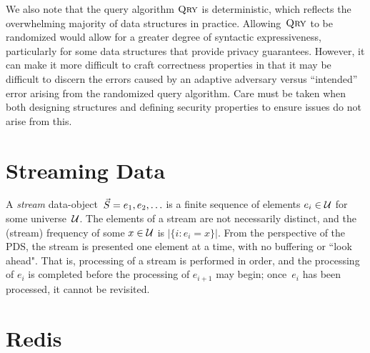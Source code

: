 We also note that the query algorithm $\textnormal{\textsc{Qry}}$ is deterministic, which reflects the overwhelming majority of data structures in practice. Allowing~$\textnormal{\textsc{Qry}}$ to be randomized would allow for a greater degree of syntactic expressiveness, particularly for some data structures that provide privacy guarantees. However, it can make it more difficult to craft correctness properties in that it may be difficult to discern the errors caused by an adaptive adversary versus ``intended'' error arising from the randomized query algorithm. Care must be taken when both designing structures and defining security properties to ensure issues do not arise from this.  


\section{Streaming Data}

A \emph{stream} data-object~$\vec{S} = e_1,e_2,\ldots$ is a finite sequence of elements $e_i \in \mathcal{U}$ for some universe~$\mathcal{U}$.  
The elements of a stream are not necessarily distinct, and the (stream) frequency of some $x \in \mathcal{U}$ is $|\{i: e_i=x \}|$.  
From the perspective of the PDS, the stream is presented one element at a time, with no buffering or ``look ahead".  
That is, processing of a stream is performed in order, and the processing of $e_i$ is completed before the processing of $e_{i+1}$ may begin; once~$e_i$ has been processed, it cannot be revisited.

\section{Redis}


